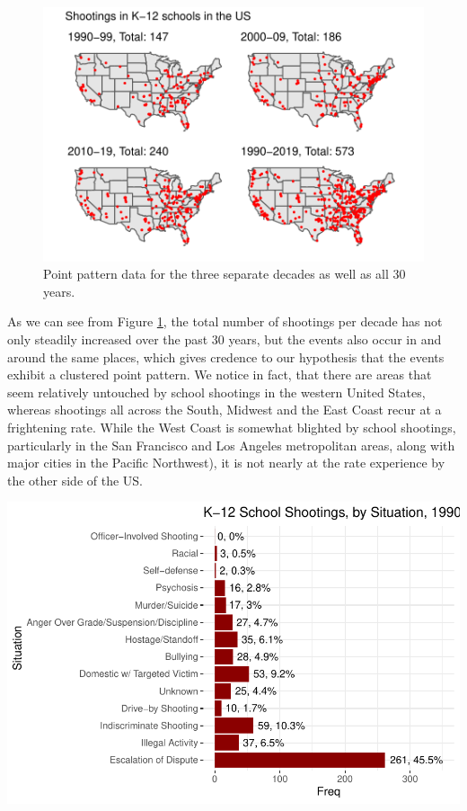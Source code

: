 \documentclass[12pt]{article}
\begin{document}
\begin{figure}
\centering
\includegraphics{JStevenRaquel_STATS295_Final_files/figure-latex/plots-all-four-1.pdf}
\caption{\label{fig:plots-all-four}Point pattern data for the three separate decades as well as all 30 years.}
\end{figure}

As we can see from Figure \ref{fig:plots-all-four}, the total number of shootings per decade has not only steadily increased over the past 30 years, but the events also occur in and around the same places, which gives credence to our hypothesis that the events exhibit a clustered point pattern. We notice in fact, that there are areas that seem relatively untouched by school shootings in the western United States, whereas shootings all across the South, Midwest and the East Coast recur at a frightening rate. While the West Coast is somewhat blighted by school shootings, particularly in the San Francisco and Los Angeles metropolitan areas, along with major cities in the Pacific Northwest), it is not nearly at the rate experience by the other side of the US.

\includegraphics{JStevenRaquel_STATS295_Final_files/figure-latex/plot-situation-1.pdf}
\end{document}
